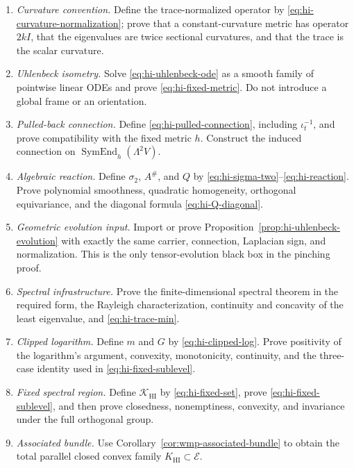 \documentclass[10pt]{coll-l}
\theoremstyle{definition}
\theoremstyle{remark}
\numberwithin{section}{chapter}
\numberwithin{equation}{chapter}
\begin{document}
\begin{enumerate}
\item \emph{Curvature convention.}
      Define the trace-normalized operator by
      \eqref{eq:hi-curvature-normalization}; prove that a constant-curvature
      metric has operator $2kI$, that the eigenvalues are twice sectional
      curvatures, and that the trace is the scalar curvature.
\item \emph{Uhlenbeck isometry.}
      Solve \eqref{eq:hi-uhlenbeck-ode} as a smooth family of pointwise
      linear ODEs and prove \eqref{eq:hi-fixed-metric}.  Do not introduce a
      global frame or an orientation.
\item \emph{Pulled-back connection.}
      Define \eqref{eq:hi-pulled-connection}, including
      $\iota_t^{-1}$, and prove compatibility with the fixed metric $h$.
      Construct the induced connection on
      $\operatorname{SymEnd}_h(\Lambda^2V)$.
\item \emph{Algebraic reaction.}
      Define $\sigma_2$, $A^\#$, and $Q$ by
      \eqref{eq:hi-sigma-two}--\eqref{eq:hi-reaction}.  Prove polynomial
      smoothness, quadratic homogeneity, orthogonal equivariance, and the
      diagonal formula \eqref{eq:hi-Q-diagonal}.
\item \emph{Geometric evolution input.}
      Import or prove Proposition~\ref{prop:hi-uhlenbeck-evolution} with
      exactly the same carrier, connection, Laplacian sign, and
      normalization.  This is the only tensor-evolution black box in the
      pinching proof.
\item \emph{Spectral infrastructure.}
      Prove the finite-dimensional spectral theorem in the required form,
      the Rayleigh characterization, continuity and concavity of the least
      eigenvalue, and \eqref{eq:hi-trace-min}.
\item \emph{Clipped logarithm.}
      Define $m$ and $G$ by \eqref{eq:hi-clipped-log}.  Prove positivity of
      the logarithm's argument, convexity, monotonicity, continuity, and
      the three-case identity used in \eqref{eq:hi-fixed-sublevel}.
\item \emph{Fixed spectral region.}
      Define $\mathcal K_{\mathrm{HI}}$ by
      \eqref{eq:hi-fixed-set}, prove
      \eqref{eq:hi-fixed-sublevel}, and then prove closedness, nonemptiness,
      convexity, and invariance under the full orthogonal group.
\item \emph{Associated bundle.}
      Use Corollary~\ref{cor:wmp-associated-bundle} to obtain the total
      parallel closed convex family $K_{\mathrm{HI}}\subset\mathcal E$.

\end{enumerate}
\end{document}

